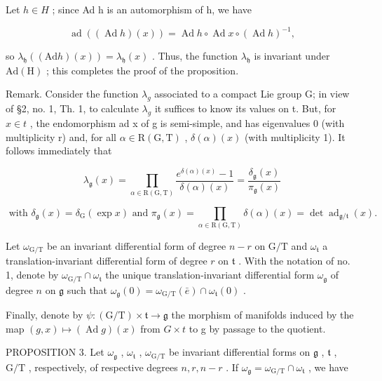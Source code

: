 Let \(h \in H\) ; since Ad h is an automorphism of h, we have

\[
\operatorname{ad} \left((\operatorname{Ad} h) (x)\right) = \operatorname{Ad} h \circ \operatorname{Ad} x \circ (\operatorname{Ad} h) ^ {- 1},
\]

so \(\lambda_{\mathfrak{h}}((\mathrm{Ad}h)(x)) = \lambda_{\mathfrak{h}}(x)\) . Thus, the function \(\lambda_{\mathfrak{h}}\) is invariant under \(\mathrm{Ad(H)}\) ; this completes the proof of the proposition.

Remark. Consider the function \(\lambda_{g}\) associated to a compact Lie group G; in view of §2, no. 1, Th. 1, to calculate \(\lambda_{g}\) it suffices to know its values on t. But, for \(x \in t\) , the endomorphism ad x of g is semi-simple, and has eigenvalues 0 (with multiplicity r) and, for all \(\alpha \in \mathrm{R}(\mathrm{G}, \mathrm{T})\) , \(\delta(\alpha)(x)\) (with multiplicity 1). It follows immediately that

\[
\lambda_ {\mathfrak {g}} (x) = \prod_ {\alpha \in \mathrm{R} (\mathrm{G}, \mathrm{T})} \frac {e ^ {\delta (\alpha) (x)} - 1}{\delta (\alpha) (x)} = \frac {\delta_ {\mathfrak {g}} (x)}{\pi_ {\mathfrak {g}} (x)}\tag{11}
\]

\[
\text { with } \delta_ {\mathfrak {g}} (x) = \delta_ {\mathrm{G}} (\exp x) \text { and } \pi_ {\mathfrak {g}} (x) = \prod_ {\alpha \in \mathrm{R} (\mathrm{G}, \mathrm{T})} \delta (\alpha) (x) = \det \operatorname{ad} _ {\mathfrak {g} / \mathfrak {t}} (x).
\]

Let \(\omega_{\mathrm{G / T}}\) be an invariant differential form of degree \(n - r\) on \(\mathrm{G / T}\) and \(\omega_{\mathfrak{t}}\) a translation-invariant differential form of degree \(r\) on \(\mathfrak{t}\) . With the notation of no. 1, denote by \(\omega_{\mathrm{G / T}} \cap \omega_{\mathfrak{t}}\) the unique translation-invariant differential form \(\omega_{\mathfrak{g}}\) of degree \(n\) on \(\mathfrak{g}\) such that \(\omega_{\mathfrak{g}}(0) = \omega_{\mathrm{G / T}}(\bar{e}) \cap \omega_{\mathfrak{t}}(0)\) .

Finally, denote by \(\psi:(\mathrm{G}/\mathrm{T})\times\mathfrak{t}\to\mathfrak{g}\) the morphism of manifolds induced by the map \((g,x)\mapsto(\operatorname{Ad}g)(x)\) from \(G\times t\) to g by passage to the quotient.

PROPOSITION 3. Let \(\omega_{\mathfrak{g}}\) , \(\omega_{\mathfrak{t}}\) , \(\omega_{\mathrm{G / T}}\) be invariant differential forms on \(\mathfrak{g}\) , \(\mathfrak{t}\) , \(\mathrm{G / T}\) , respectively, of respective degrees \(n, r, n - r\) . If \(\omega_{\mathfrak{g}} = \omega_{\mathrm{G / T}} \cap \omega_{\mathfrak{t}}\) , we have

